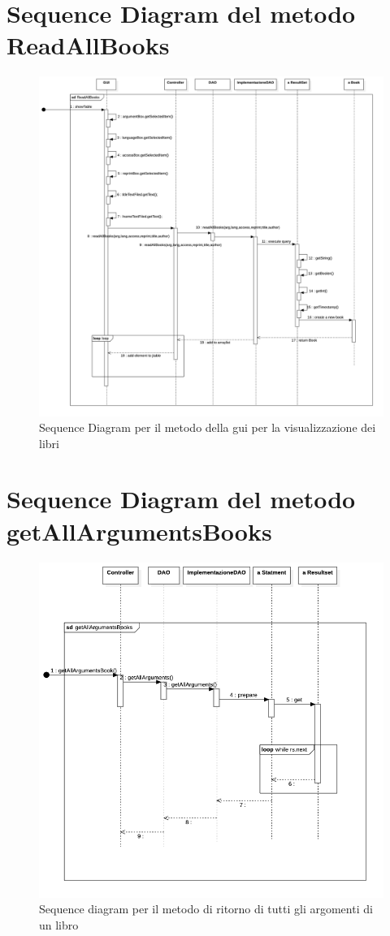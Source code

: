 	\newpage
	\section{Sequence Diagram del metodo ReadAllBooks}
	\begin{figure}[hbt]
  \includegraphics[width=\textwidth]{Immagini/ReadAllBooksSD.png}
  \caption{Sequence Diagram per il metodo della gui per la visualizzazione dei libri}
\end{figure}
\newpage

	\section{Sequence Diagram del metodo getAllArgumentsBooks}
	\begin{figure}[hbt]
  \includegraphics[width=\textwidth]{Immagini/getAllArgumentsBooksSD.png}
  \caption{Sequence diagram per il metodo di ritorno di tutti gli argomenti di un libro}
\end{figure}
